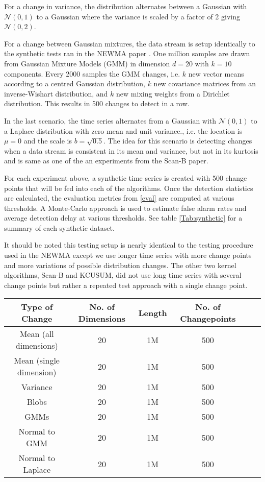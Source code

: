 For a change in variance, the distribution alternates between a Gaussian with $\mathcal{N}(0,1)$ to a Gaussian where the variance is scaled by a factor of 2 giving $\mathcal{N}(0,2)$.

For a change between Gaussian mixtures, the data stream is setup identically to the synthetic tests ran in the NEWMA paper \cite{keriven2018newma}. One million samples are drawn from Gaussian Mixture Models (GMM) in dimension $d = 20$
with $k = 10$ components. Every 2000 samples the GMM changes, i.e. $k$
new vector means according to a centred Gaussian distribution, $k$ new covariance matrices from an
inverse-Wishart distribution, and $k$ new mixing weights from a Dirichlet distribution. This results in 500
changes to detect in a row.

In the last scenario, the time series alternates from a Gaussian with $\mathcal{N}(0,1)$ to a Laplace distribution with zero mean and unit variance., i.e. the location is $\mu=0$ and the scale is $b=\sqrt{0.5}$. The idea for this scenario is detecting changes when a data stream is consistent in its mean and variance, but not in its kurtosis and is same as one of the an experiments from the Scan-B paper.

For each experiment above, a synthetic time series is created with 500 change points that will be fed into each of the algorithms.  Once the detection statistics are calculated, the evaluation metrics from \ref{eval} are computed at various thresholds. A Monte-Carlo approach is used to estimate false alarm rates and average detection delay at various thresholds. See table \ref{Tab:synthetic} for a summary of each synthetic dataset.

It should be noted this testing setup is nearly identical to the testing procedure used in the NEWMA except we use longer time series with more change points and more variations of possible distribution changes. The other two kernel algorithms, Scan-B and KCUSUM, did not use long time series with several change points but rather a repeated test approach with a single change point. 

\begin{center}
\begin{tabular}{SSSSSS} \toprule
    {Type of Change} & {No. of Dimensions} & {Length} & {No. of Changepoints}  \\ \midrule
    {Mean (all dimensions)}  & 20 & {1M} & 500  \\
    {Mean (single dimension)}  & 20 & {1M} & 500  \\
    {Variance}  & 20 & {1M} & 500  \\
    {Blobs}  & 20 & {1M}  & 500  \\
    {GMMs}  & 20 & {1M}  & 500  \\ 
    {Normal to GMM}  & 20 & {1M}  & 500  \\ 
    {Normal to Laplace} & 20 & {1M}  & 500  \\ \bottomrule
\end{tabular}
 \label{Tab:synthetic}
\end{center}

